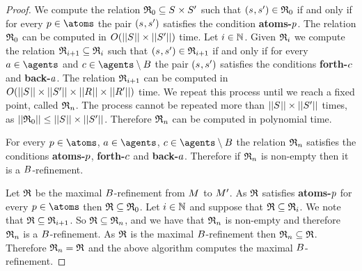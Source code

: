 \begin{proof}
We compute the relation $\refinement_0 \subseteq \kStates \times \kStatesP$ such that $(\kStateS, \kStateSP) \in \refinement_0$ if and only if for every $\atomP \in \atoms$ the pair $(\kStateS, \kStateSP)$ satisfies the condition {\bf atoms-$p$}.
The relation $\mathfrak{R}_0$ can be computed in $O(||\kStates|| \times ||\kStatesP||)$ time.
Let $i \in \mathbb{N}$.
Given $\mathfrak{R}_i$ we compute the relation $\mathfrak{R}_{i+1} \subseteq \mathfrak{R}_i$ such that $(\kStateS, \kStateSP) \in \refinement_{i+1}$ if and only if for every $\agentA \in \agents$ and $\agentC \in \agents \setminus \agentsB$ the pair $(\kStateS, \kStateSP)$ satisfies the conditions {\bf forth-$c$} and {\bf back-$a$}.
The relation $\mathfrak{R}_{i+1}$ can be computed in $O(||\kStates|| \times ||\kStatesP|| \times ||\kAccessibilityRel|| \times ||\kAccessibilityRelP||)$ time.
We repeat this process until we reach a fixed point, called $\mathfrak{R}_n$.
The process cannot be repeated more than $||\kStates|| \times ||\kStatesP||$ times, as $||\refinement_0|| \leq ||\kStates|| \times ||\kStatesP||$.
Therefore $\mathfrak{R}_n$ can be computed in polynomial time.

For every $\atomP \in \atoms$, $\agentA \in \agents$, $\agentC \in \agents \setminus \agentsB$ the relation $\mathfrak{R}_n$ satisfies the conditions {\bf atoms-$p$}, {\bf forth-$c$} and {\bf back-$a$}.
Therefore if $\mathfrak{R}_n$ is non-empty then it is a $B$-refinement.

Let $\mathfrak{R}$ be the maximal $B$-refinement from $\kModel$ to ${M^{\prime}_{}}$.
As $\mathfrak{R}$ satisfies {\bf atoms-$p$} for every $\atomP \in \atoms$ then $\mathfrak{R} \subseteq \mathfrak{R}_0$.
Let $i \in \mathbb{N}$ and suppose that $\mathfrak{R} \subseteq \mathfrak{R}_i$. 
We note that $\mathfrak{R} \subseteq \mathfrak{R}_{i + 1}$.
So $\mathfrak{R} \subseteq \mathfrak{R}_n$, and we have that $\mathfrak{R}_n$ is non-empty and therefore $\mathfrak{R}_n$ is a $B$-refinement.
As $\mathfrak{R}$ is the maximal $B$-refinement then $\mathfrak{R}_n \subseteq \mathfrak{R}$.
Therefore $\mathfrak{R}_n = \mathfrak{R}$ and the above algorithm computes the maximal $B$-refinement.
\end{proof}
